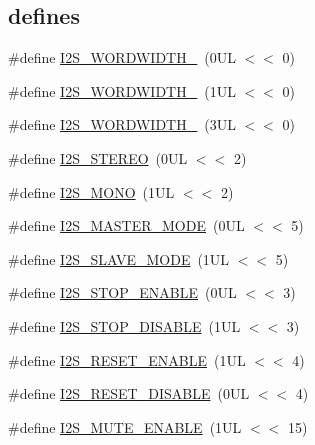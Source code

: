 \subsection*{\textquotesingle{}defines\textquotesingle{}}
\begin{DoxyCompactItemize}
\item 
\#define \hyperlink{group___i2_s__18_x_x__43_x_x_ga17cb1a91d5be4e7afad486ead6d2980d}{I2\+S\+\_\+\+W\+O\+R\+D\+W\+I\+D\+T\+H\+\_}~(0\+U\+L $<$$<$ 0)
\item 
\#define \hyperlink{group___i2_s__18_x_x__43_x_x_ga4d016baad0fba07da20a6410470c71d3}{I2\+S\+\_\+\+W\+O\+R\+D\+W\+I\+D\+T\+H\+\_}~(1\+U\+L $<$$<$ 0)
\item 
\#define \hyperlink{group___i2_s__18_x_x__43_x_x_ga683d81436e91c1631bdd5947ee78489b}{I2\+S\+\_\+\+W\+O\+R\+D\+W\+I\+D\+T\+H\+\_}~(3\+U\+L $<$$<$ 0)
\item 
\#define \hyperlink{group___i2_s__18_x_x__43_x_x_ga07e34ebc83183644aa54cc124b769a43}{I2\+S\+\_\+\+S\+T\+E\+R\+EO}~(0\+U\+L $<$$<$ 2)
\item 
\#define \hyperlink{group___i2_s__18_x_x__43_x_x_ga3c732d1467300d87c582a1497e8dbadf}{I2\+S\+\_\+\+M\+O\+NO}~(1\+U\+L $<$$<$ 2)
\item 
\#define \hyperlink{group___i2_s__18_x_x__43_x_x_ga67cd00ecbec35d0dd723909916fb1014}{I2\+S\+\_\+\+M\+A\+S\+T\+E\+R\+\_\+\+M\+O\+DE}~(0\+U\+L $<$$<$ 5)
\item 
\#define \hyperlink{group___i2_s__18_x_x__43_x_x_ga37137132251bc15250edcea1585d3e58}{I2\+S\+\_\+\+S\+L\+A\+V\+E\+\_\+\+M\+O\+DE}~(1\+U\+L $<$$<$ 5)
\item 
\#define \hyperlink{group___i2_s__18_x_x__43_x_x_gabe1e11f6f4ce8542408e466b3316ca3c}{I2\+S\+\_\+\+S\+T\+O\+P\+\_\+\+E\+N\+A\+B\+LE}~(0\+U\+L $<$$<$ 3)
\item 
\#define \hyperlink{group___i2_s__18_x_x__43_x_x_gaf442a366f6467626a2f72fdabf9b6d89}{I2\+S\+\_\+\+S\+T\+O\+P\+\_\+\+D\+I\+S\+A\+B\+LE}~(1\+U\+L $<$$<$ 3)
\item 
\#define \hyperlink{group___i2_s__18_x_x__43_x_x_gae090c11fade3a6f9bf9791dba1920556}{I2\+S\+\_\+\+R\+E\+S\+E\+T\+\_\+\+E\+N\+A\+B\+LE}~(1\+U\+L $<$$<$ 4)
\item 
\#define \hyperlink{group___i2_s__18_x_x__43_x_x_gaf008515f40666122bb1936e591b7ed99}{I2\+S\+\_\+\+R\+E\+S\+E\+T\+\_\+\+D\+I\+S\+A\+B\+LE}~(0\+U\+L $<$$<$ 4)
\item 
\#define \hyperlink{group___i2_s__18_x_x__43_x_x_ga3f418f8bc5e6f401481d3b9e241758bb}{I2\+S\+\_\+\+M\+U\+T\+E\+\_\+\+E\+N\+A\+B\+LE}~(1\+U\+L $<$$<$ 15)

\end{DoxyCompactItemize}
